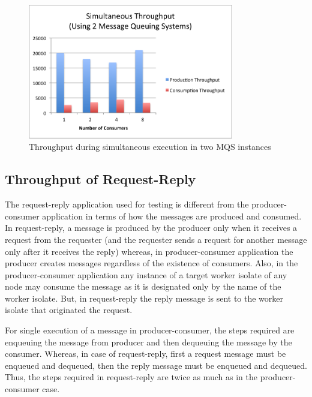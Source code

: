 \begin{figure}[H]
  \centering
  \includegraphics[width=0.8\textwidth]{figures/08simultaneous2}
  \caption[Throughput during simultaneous execution in two MQS]{Throughput during simultaneous execution in two MQS instances}
  \label{fig:result-simultaneous2}
\end{figure}


\subsection{Throughput of Request-Reply}
\label{subsec:request-reply}
  The request-reply application used for testing is different from the producer-consumer application in terms of how the messages are produced and consumed. In request-reply, a message is produced by the producer only when it receives a request from the requester (and the requester sends a request for another message only after it receives the reply) whereas, in producer-consumer application the producer creates messages regardless of the existence of consumers. Also, in the producer-consumer application any instance of a target worker isolate of any node may consume the message as it is designated only by the name of the worker isolate. But, in request-reply the reply message is sent to the worker isolate that originated the request.

  For single execution of a message in producer-consumer, the steps required are enqueuing the message from producer and then dequeuing the message by the consumer. Whereas, in case of request-reply, first a request message must be enqueued and dequeued, then the reply message must be enqueued and dequeued. Thus, the steps required in request-reply are twice as much as in the producer-consumer case.

